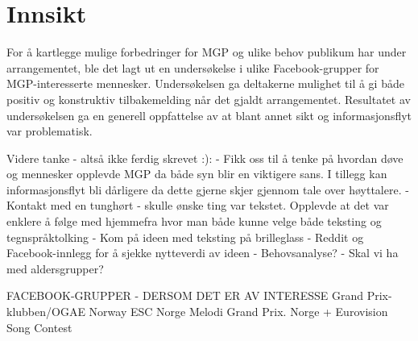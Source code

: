 \section{Innsikt}
\label{sec:innsikt}
For å kartlegge mulige forbedringer for MGP og ulike behov publikum har under arrangementet, ble det lagt ut en undersøkelse i ulike Facebook-grupper for MGP-interesserte mennesker. Undersøkelsen ga deltakerne mulighet til å gi både positiv og konstruktiv tilbakemelding når det gjaldt arrangementet. Resultatet av undersøkelsen ga en generell oppfattelse av at blant annet sikt og informasjonsflyt var problematisk. 

\newline
Videre tanke - altså ikke ferdig skrevet :):
\newline
- Fikk oss til å tenke på hvordan døve og mennesker opplevde MGP da både syn blir en viktigere sans. I tillegg kan informasjonsflyt bli dårligere da dette gjerne skjer gjennom tale over høyttalere. \newline
- Kontakt med en tunghørt - skulle ønske ting var tekstet. Opplevde at det var enklere å følge med hjemmefra hvor man både kunne velge både teksting og tegnspråktolking
- Kom på ideen med teksting på brilleglass\newline
- Reddit og Facebook-innlegg for å sjekke nytteverdi av ideen \newline
- Behovsanalyse?\newline
- Skal vi ha med aldersgrupper?



FACEBOOK-GRUPPER - DERSOM DET ER AV INTERESSE
Grand Prix-klubben/OGAE Norway
ESC Norge
Melodi Grand Prix. Norge + Eurovision Song Contest